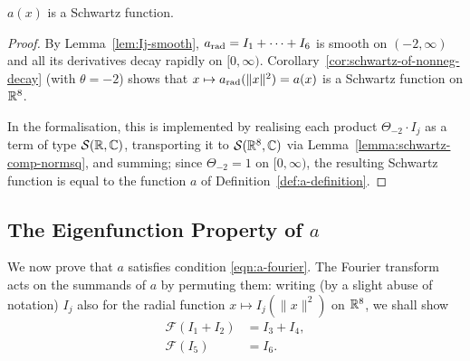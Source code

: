 \begin{proposition}\label{prop:a-schwartz}\leanok
{}
$a(x)$ is a Schwartz function.
\end{proposition}
\begin{proof}
By Lemma~\ref{lem:Ij-smooth}, $a_{\mathrm{rad}} = I_1 + \cdots + I_6$ is smooth on $(-2, \infty)$ and all its derivatives decay rapidly on $[0, \infty)$. Corollary~\ref{cor:schwartz-of-nonneg-decay} (with $\theta = -2$) shows that $x \mapsto a_{\mathrm{rad}}(\|x\|^2) = a(x)$ is a Schwartz function on $\mathbb{R}^8$.

In the formalisation, this is implemented by realising each product $\Theta_{-2} \cdot I_j$ as a term of type $\mathcal{S}(\mathbb{R}, \mathbb{C})$, transporting it to $\mathcal{S}(\mathbb{R}^8, \mathbb{C})$ via Lemma~\ref{lemma:schwartz-comp-normsq}, and summing; since $\Theta_{-2} = 1$ on $[0, \infty)$, the resulting Schwartz function is equal to the function $a$ of Definition~\ref{def:a-definition}.
\end{proof}

\subsection{The Eigenfunction Property of $a$}

We now prove that $a$ satisfies condition \eqref{eqn:a-fourier}. The Fourier transform acts on the summands of $a$ by permuting them: writing (by a slight abuse of notation) $I_j$ also for the radial function $x \mapsto I_j(\|x\|^2)$ on $\mathbb{R}^8$, we shall show
\begin{align}
    \mathcal{F}(I_1 + I_2) &= I_3 + I_4, \label{eqn:a-perm-12}\\
    \mathcal{F}(I_5) &= I_6. \label{eqn:a-perm-56}
\end{align}

